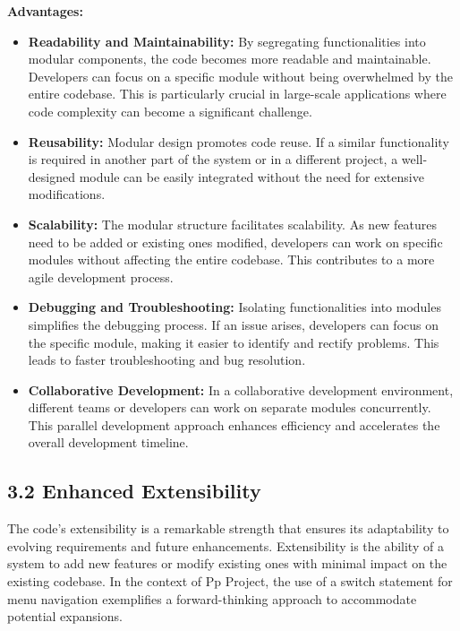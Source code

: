 \documentclass{article}
\begin{document}
\textbf{Advantages:}
\begin{itemize}
    \item \textbf{Readability and Maintainability:} By segregating functionalities into modular components, the code becomes more readable and maintainable.
    Developers can focus on a specific module without being overwhelmed by the entire codebase. 
    This is particularly crucial in large-scale applications where code complexity can become a significant challenge.
    \item \textbf{Reusability:} Modular design promotes code reuse. 
    If a similar functionality is required in another part of the system or in a different project, 
    a well-designed module can be easily integrated without the need for extensive modifications. 
    \item \textbf{Scalability:} The modular structure facilitates scalability. 
    As new features need to be added or existing ones modified, developers can work on specific modules without affecting the entire codebase. 
    This contributes to a more agile development process.
    \item \textbf{Debugging and Troubleshooting:} Isolating functionalities into modules simplifies the debugging process. 
    If an issue arises, developers can focus on the specific module, making it easier to identify and rectify problems. 
    This leads to faster troubleshooting and bug resolution.
    \item \textbf{Collaborative Development:} In a collaborative development environment, different teams or developers can work on separate modules concurrently. 
    This parallel development approach enhances efficiency and accelerates the overall development timeline.
\end{itemize}

\subsection*{\textbf{3.2 Enhanced Extensibility}}

The code's extensibility is a remarkable strength that ensures its adaptability to evolving requirements 
and future enhancements. Extensibility is the ability of a system to add new features or modify existing ones with minimal impact on the existing codebase. 
In the context of Pp Project, the use of a switch statement for menu navigation exemplifies a forward-thinking approach to accommodate potential expansions.
\end{document}
